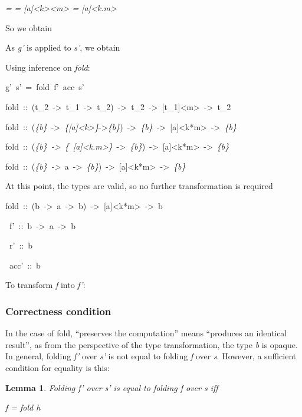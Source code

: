 \documentclass{article}
\newenvironment{lyxcode}
{\par\begin{list}{}{
\setlength{\rightmargin}{\leftmargin}
\setlength{\listparindent}{0pt}\raggedright
\setlength{\itemsep}{0pt}
\setlength{\parsep}{0pt}
\normalfont\ttfamily}\item[]}
{\end{list}}
\newtheorem{lemma}{Lemma}
\begin{document}
\emph{=  } \emph{= 
{[}a{]}<k><m> = {[}a{]}<k.m>}

So we obtain
\begin{lyxcode}



\end{lyxcode}
As \emph{g'} is applied to \emph{s'}, we obtain 
\begin{lyxcode}

\end{lyxcode}
Using inference on \emph{fold}:
\begin{lyxcode}
g'~s'~=~fold~f'~acc~s'

fold~::~(t\_2~->~t\_1~->~t\_2)~->~t\_2~->~{[}t\_1{]}<m>~->~t\_2

fold~::~(\emph{\{b\}}~->~\emph{\{{[}a{]}<k>\}}->\emph{\{b\}})~->~\emph{\{b\}}~->~{[}a{]}<k{*}m>~->~\emph{\{b\}}

fold~::~(\emph{\{b\}~->~\{}~\emph{{[}a{]}<k.m>\}}~->~\emph{\{b\}})~->~{[}a{]}<k{*}m>~->~\emph{\{b\}}

fold~::~(\emph{\{b\}~->}~a~->~\emph{\{b\}})~->~{[}a{]}<k{*}m>~->~\emph{\{b\}}
\end{lyxcode}
At this point, the types are valid, so no further transformation is
required
\begin{lyxcode}
fold~::~(b~->~a~->~b)~->~{[}a{]}<k{*}m>~->~b

~f'~::~b~->~a~->~b

~r'~::~b

~acc'~::~b
\end{lyxcode}
To transform \emph{f} into \emph{f'}:
\begin{lyxcode}

\end{lyxcode}

\subsubsection{Correctness condition}

In the case of fold, ``preserves the computation'' means ``produces
an identical result'', as from the perspective of the type transformation,
the type \emph{b} is opaque. In general, folding \emph{f'} over \emph{s'}
is not equal to folding \emph{f} over \emph{s}. However, a sufficient
condition for equality is this:

\begin{lemma}

Folding \emph{f'} over \emph{s'} is equal to folding \emph{f} over
\emph{s} iff 

\emph{f = fold h}

\end{lemma}
\end{document}
